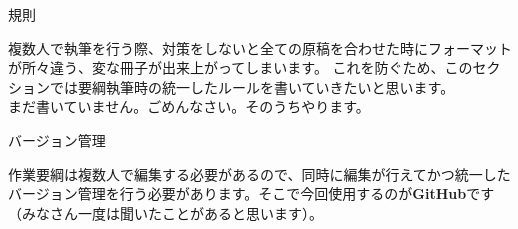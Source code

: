 \documentclass[b4paper,landscape, 8pt, nomag, dvipdfmx, papersize, uplatex]{jsarticle}
\renewcommand{\textbf}[1]{{\gtfamily\bfseries #1}}
\renewcommand{\section}[1]{\vspace{3truemm} \ascboxD[D]{\fontsize{11truept}{12truept}\selectfont #1}}
\renewcommand{\section}[1]{\vspace{-2truemm} \begin{center}{\fontsize{14truept}{10truemm}\selectfont #1}\end{center}\vspace{2truemm}}
\renewcommand{\subsection}[2]{\vspace{6truemm}{\fontsize{13truept}{13truept}\selectfont\textbf{\noindent #1~}{\fontsize{10truept}{10truept}\selectfont ~#2\\}}}
\begin{document}
\begin{multicols*}{4}
\newcolumn

\section{規則}
\hspace{1zw}複数人で執筆を行う際、対策をしないと全ての原稿を合わせた時にフォーマットが所々違う、変な冊子が出来上がってしまいます。
これを防ぐため、このセクションでは要綱執筆時の統一したルールを書いていきたいと思います。\\
\indent まだ書いていません。ごめんなさい。そのうちやります。\\
\begin{comment}
\subsection{1}{文字のルール}

\subsection{2}{画像の入れ方}

\subsection{3}{リストの使い方}

\subsection{4}{枠囲み}

\subsection{5}{文献参照}

\subsection{6}{索引対象となる用語}
\end{comment}
\newcolumn
\section{バージョン管理}
\hspace{1zw}作業要綱は複数人で編集する必要があるので、同時に編集が行えてかつ統一したバージョン管理を行う必要があります。そこで今回使用するのが\textbf{GitHub}です（みなさん一度は聞いたことがあると思います）。\\


\end{multicols*}
\end{document}
